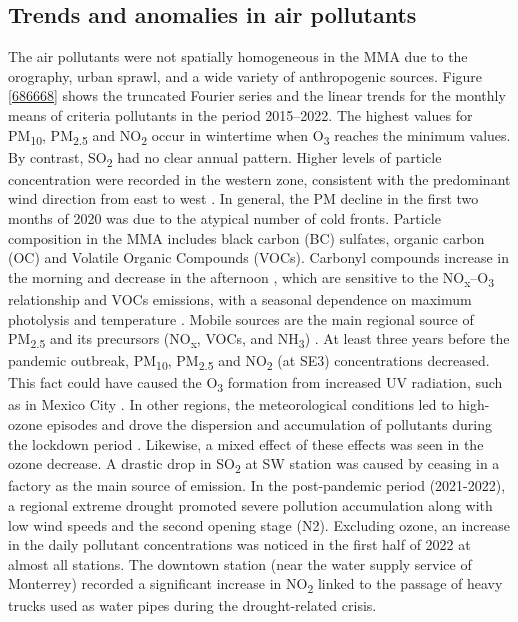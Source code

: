 \documentclass[preprint,12pt]{elsarticle}
\begin{document}
\subsection{Trends and anomalies in air pollutants}
The air pollutants were not spatially homogeneous in the MMA due to the orography, urban sprawl, and a wide variety of anthropogenic sources. Figure \ref{686668} shows the truncated Fourier series and the linear trends for the monthly means of criteria pollutants in the period 2015–2022. The highest values for PM\textsubscript{10}, PM\textsubscript{2.5} and NO\textsubscript{2} occur in wintertime when O\textsubscript{3} reaches the minimum values. By contrast, SO\textsubscript{2} had no clear annual pattern. Higher levels of particle concentration were recorded in the western zone, consistent with the predominant wind direction from east to west \citep{Gonz_lez_Santiago_2011}. In general, the PM decline in the first two months of 2020 was due to the atypical number of cold fronts. Particle composition in the MMA includes black carbon (BC) \citep{Peralta_2019} sulfates, organic carbon (OC) \citep{Mancilla_2019} and Volatile Organic Compounds (VOCs). Carbonyl compounds increase in the morning and decrease in the afternoon \citep{j2012}, which are sensitive to the NO\textsubscript{x}--O\textsubscript{3} relationship and VOCs emissions, with a seasonal dependence on maximum photolysis and temperature \citep{Menchaca_Torre_2015,Menchaca_Torre_2015a, Hern_ndez_Paniagua_2017}. Mobile sources are the main regional source of PM\textsubscript{2.5} and its precursors (NO\textsubscript{x}, VOCs, and NH\textsubscript{3}) \citep{Martinez-Cinco2016}. At least three years before the pandemic outbreak, PM\textsubscript{10}, PM\textsubscript{2.5} and NO\textsubscript{2} (at SE3) concentrations decreased. This fact could have caused the O\textsubscript{3} formation from increased UV radiation, such as in Mexico City \citep{Ipi_a_2021}. In other regions, the meteorological conditions led to high-ozone episodes and drove the dispersion and accumulation of pollutants during the lockdown period \citep{Tello_Leal_2021,Bera_2022,SULAYMON}. Likewise, a mixed effect of these effects was seen in the ozone decrease. A drastic drop in SO\textsubscript{2} at SW station was caused by ceasing in a factory as the main source of emission. In the post-pandemic period (2021-2022), a regional extreme drought promoted severe pollution accumulation along with low wind speeds and the second opening stage (N2). Excluding ozone, an increase in the daily pollutant concentrations was noticed in the first half of 2022 at almost all stations. The downtown station (near the water supply service of Monterrey) recorded a significant increase in NO\textsubscript{2} linked to the passage of heavy trucks used as water pipes during the drought-related crisis.
\end{document}
